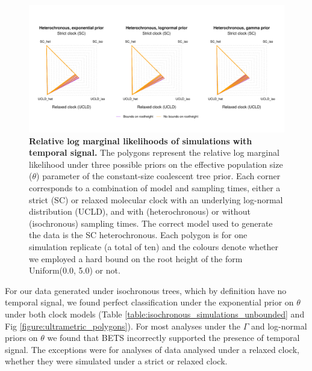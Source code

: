 \documentclass[10pt,letterpaper]{article}
\begin{document}
\begin{figure}[!h]
	\begin{center}
		\includegraphics[width=14cm]{sandbox_figures/het_sims.pdf}\newline
		\vspace{-0.5cm}
		\caption{\textbf{Relative log marginal likelihoods of simulations with temporal signal.} The polygons represent the relative log marginal likelihood under three possible priors on the effective population size ($\theta$) parameter of the constant-size coalescent tree prior. Each corner corresponds to a combination of model and sampling times, either a strict (SC) or relaxed molecular clock with an underlying log-normal distribution (UCLD), and with (heterochronous) or without (isochronous) sampling times. The correct model used to generate the data is the SC heterochronous. Each polygon is for one simulation replicate (a total of ten) and the colours denote whether we employed a hard bound on the root height of the form Uniform(0.0, 5.0) or not.} 
		\label{figure:heterochronous_polygons}
	\end{center}
\end{figure}

For our data generated under isochronous trees, which by definition have no temporal signal, we found perfect classification under the exponential prior on $\theta$ under both clock models (Table \ref{table:isochronous_simulations_unbounded} and Fig \ref{figure:ultrametric_polygons}). For most analyses under the $\Gamma$ and log-normal priors on $\theta$ we found that BETS incorrectly supported the presence of temporal signal. The exceptions were for analyses of data analysed under a relaxed clock, whether they were simulated under a strict or relaxed clock. 
\end{document}
